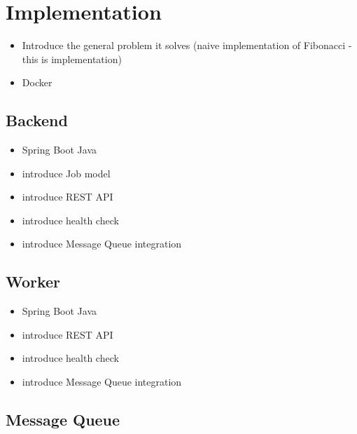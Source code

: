 \section{Implementation}

\begin{itemize}
	\item Introduce the general problem it solves (naive implementation of Fibonacci - this is implementation)
	\item Docker
\end{itemize}

\subsection{Backend}

\begin{itemize}
	\item Spring Boot Java
	\item introduce Job model
	\item introduce REST API
	\item introduce health check
	\item introduce Message Queue integration
\end{itemize}

\subsection{Worker}

\begin{itemize}
	\item Spring Boot Java
	\item introduce REST API
	\item introduce health check
	\item introduce Message Queue integration
\end{itemize}

\subsection{Message Queue}

